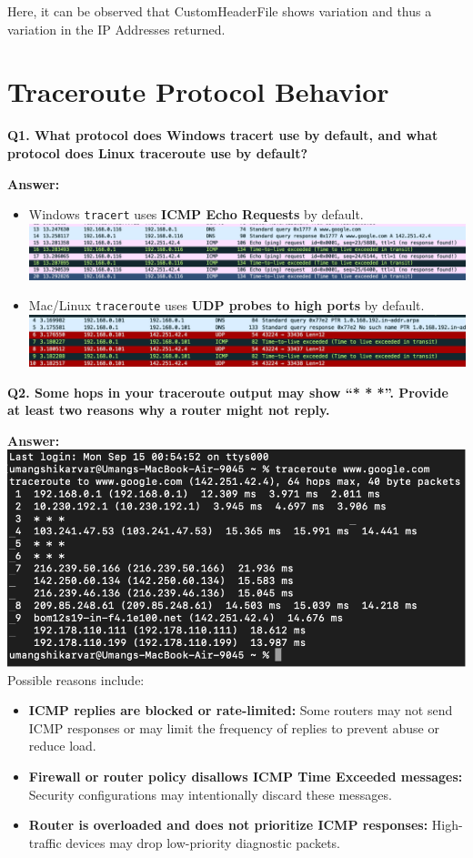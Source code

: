 \documentclass[12pt, a4paper]{report}
\begin{document}
Here, it can be observed that CustomHeaderFile shows variation and thus a variation in the IP Addresses returned.

\chapter{Traceroute Protocol Behavior}

\textbf{Q1. What protocol does Windows tracert use by default, and what protocol does Linux traceroute use by default?}

\textbf{Answer:}  
\begin{itemize}[leftmargin=*]
    \item Windows \texttt{tracert} uses \textbf{ICMP Echo Requests} by default.
    \\
    \includegraphics[width=1\linewidth]{images/image.png}
    \item Mac/Linux \texttt{traceroute} uses \textbf{UDP probes to high ports} by default.
    \\
    \includegraphics[width=1\linewidth]{images/image copy.png}
\end{itemize}

\textbf{Q2. Some hops in your traceroute output may show ``* * *''. Provide at least two reasons why a router might not reply.}

\textbf{Answer:}
\\  
\includegraphics[width=0.85\linewidth]{images/Picture 1.png}
\\
Possible reasons include:
\begin{itemize}[leftmargin=*]
    \item \textbf{ICMP replies are blocked or rate-limited:} Some routers may not send ICMP responses or may limit the frequency of replies to prevent abuse or reduce load.
    \item \textbf{Firewall or router policy disallows ICMP Time Exceeded messages:} Security configurations may intentionally discard these messages.
    \item \textbf{Router is overloaded and does not prioritize ICMP responses:} High-traffic devices may drop low-priority diagnostic packets.
\end{itemize}
\end{document}
